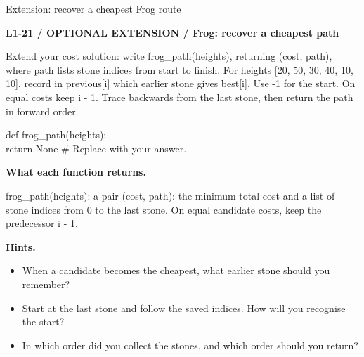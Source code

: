 \documentclass[11pt,a4paper]{article}
\begin{document}
\par\noindent\begin{minipage}{\linewidth}
{\heavy\fontsize{12}{15}\selectfont Extension: recover a cheapest Frog route\par}\medskip
\textbf{L1-21 / OPTIONAL EXTENSION / Frog: recover a cheapest path}\par\smallskip Extend your cost solution: write frog\_path(heights), returning (cost, path), where path lists stone indices from start to finish. For heights [20, 50, 30, 40, 10, 10], record in previous[i] which earlier stone gives best[i]. Use -1 for the start. On equal costs keep i - 1. Trace backwards from the last stone, then return the path in forward order.\par
\par{}\par\smallskip\noindent\colorbox{codepaper}{\parbox{\dimexpr\linewidth-2\fboxsep\relax}{\small\ttfamily\raggedright def frog\_path(heights):\\\hspace*{2.4em}return None  \# Replace with your answer.}}\par
{\small\textbf{What each function returns.}\par frog\_path(heights): a pair (cost, path): the minimum total cost and a list of stone indices from 0 to the last stone. On equal candidate costs, keep the predecessor i - 1.\par }
{\small\textbf{Hints.}}\begin{itemize}\item When a candidate becomes the cheapest, what earlier stone should you remember?\item Start at the last stone and follow the saved indices. How will you recognise the start?\item In which order did you collect the stones, and which order should you return?\end{itemize}
\par\smallskip{}
\end{minipage}
\end{document}
